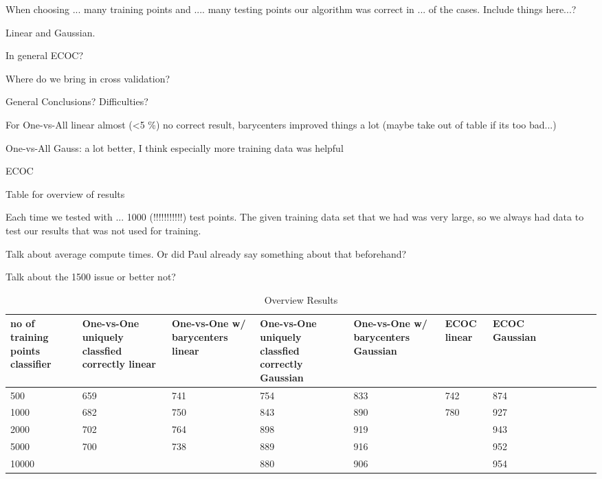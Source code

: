 When choosing ... many training points and .... many testing points our algorithm was correct in ... of the cases. Include things here...?


Linear and Gaussian.

In general ECOC?

Where do we bring in cross validation?

General Conclusions? Difficulties?

For One-vs-All linear almost (<5 \%) no correct result, barycenters improved things a lot  (maybe take out of table if its too bad...)

One-vs-All Gauss: a lot better, I think especially more training data was helpful

ECOC 

Table for overview of results 

Each time we tested with ... 1000 (!!!!!!!!!!!) test points. The given training data set that we had was very large, so we always had data to test our results that was not used for training. 

Talk about average compute times. Or did Paul already say something about that beforehand? 

Talk about the 1500 issue or better not?


\begin{table}[ht!]
	\centering
	\caption{Overview Results}
	\begin{tabular}{|l|l|l|l|l|l|l|l|l|l|l|l|} \hline
\multicolumn{1}{|p{2cm}|}{no of training points classifier} & \multicolumn{1}{p{2cm}|}{One-vs-One uniquely classfied correctly linear} & \multicolumn{1}{p{2cm}|}{One-vs-One w/ barycenters linear} & \multicolumn{1}{p{2cm}|}{One-vs-One uniquely classfied correctly Gaussian} &  \multicolumn{1}{p{2cm}|}{One-vs-One w/ barycenters Gaussian} & \multicolumn{1}{p{2cm}|}{ECOC linear} & \multicolumn{1}{p{2cm}|}{ECOC Gaussian} \\ \hline \hline
	500	& 659 & 741 & 754 & 833 & 742 & 874 \\ \hline
	1000	& 682 & 750 & 843 & 890 & 780 & 927 \\ \hline
	2000	& 702 & 764 & 898 & 919 &  & 943 \\ \hline
	5000	& 700 & 738 & 889 & 916 &  & 952 \\ \hline
	10000	&  &  & 880 & 906 &  & 954 \\ \hline
	\end{tabular}
\end{table}

